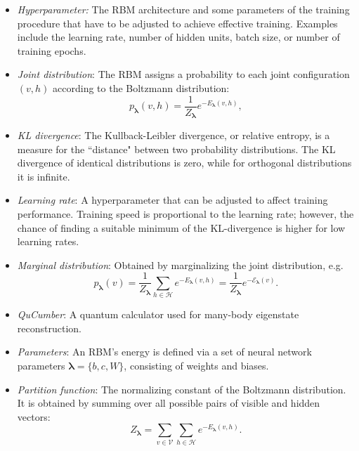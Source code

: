 \documentclass[submission, Phys, hidelnks]{SciPost}
\begin{document}
\begin{itemize}
\item{\it Hyperparameter:} The RBM architecture and some parameters of the training procedure that have to be adjusted to achieve effective training. Examples include the learning rate, number of hidden units, batch size, or number of training epochs.

\item {\it Joint distribution}: The RBM assigns a probability to each joint configuration $(v,h)$ according to the Boltzmann distribution:
\begin{equation}
   p_{\bm{\lambda}}(v,h) = \frac{1}{Z_{\bm{\lambda}}} e^{-E_{\bm{\lambda}}(v,h)},
\end{equation}

\item{\it KL divergence}: The Kullback-Leibler divergence, or relative entropy, is a measure for the ``distance" between two probability distributions. The KL divergence of identical distributions is zero, while for orthogonal distributions it is infinite.

\item{\it Learning rate}: A hyperparameter that can be adjusted to affect training performance. Training speed is proportional to the learning rate; however, the chance of finding a suitable minimum of the KL-divergence is higher for low learning rates.

\item {\it Marginal distribution}: Obtained by marginalizing the joint distribution, e.g.
\begin{equation}\label{Eq:marginal_distribution}
   p_{\bm{\lambda}}(v) = \frac{1}{Z_{\bm{\lambda}}} \sum\limits_{h\in \mathcal{H}} e^{-E_{\bm{\lambda}}(v,h)} = \frac{1}{Z_{\bm{\lambda}}} e^{- \mathcal{E}_{\bm{\lambda}}(v)}.
\end{equation}

\item {\it QuCumber}: A quantum calculator used for many-body eigenstate reconstruction.

\item {\it Parameters}: An RBM's energy is defined via a set of neural network parameters $\bm{\lambda} = \{b,c,W\}$, consisting of weights and biases.

\item {\it Partition function}: The normalizing constant of the Boltzmann distribution. It is obtained by summing over all possible pairs of visible and hidden vectors:
\begin{equation}
   Z_{\bm{\lambda}} = \sum\limits_{v\in \mathcal{V}}\sum\limits_{h\in \mathcal{H}} e^{-E_{\bm{\lambda}}(v,h)}.
\end{equation}


\end{itemize}
\end{document}
